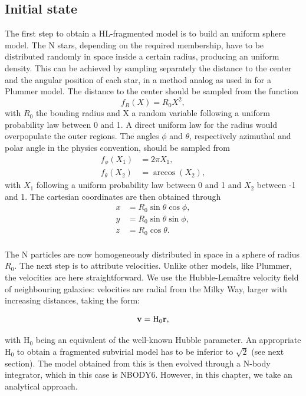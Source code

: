 \subsection{Initial state}

The first step to obtain a HL-fragmented model is to build an uniform sphere model. The N stars, depending on the required membership, have to be distributed randomly in space inside a certain radius, producing an uniform density. This can be achieved by sampling separately the distance to the center and the angular position of each star, in a method analog as used in \cite{Aarseth1974} for a Plummer model. The distance to the center should be sampled from the function
\begin{equation}
f_R(X) = R_0 X^2,
\end{equation} 
with $R_0$ the bouding radius and X a random variable following a uniform probability law between 0 and 1. A direct uniform law for the radius would overpopulate the outer regions. The angles $\phi$ and $\theta$, respectively azimuthal and polar angle in the physics convention, should be sampled from
\begin{align}
f_\phi(X_1) & = 2\pi X_1,\\
f_\theta(X_2) &= \arccos{ (X_2) },
\end{align}
with $X_1$ following a uniform probability law between 0 and 1 and $X_2$ between -1 and 1. The cartesian coordinates are then obtained through
\begin{align}
x &= R_0 \sin{\theta} \cos{\phi},\\
y &= R_0 \sin{\theta} \sin{\phi},\\
z &= R_0 \cos{\theta}. \\
\end{align}

The N particles are now homogeneously distributed in space in a sphere of radius $R_0$. The next step is to attribute velocities. Unlike other models, like Plummer, the velocities are here straightforward. We use the Hubble-Lema\^itre velocity field of neighbouring galaxies: velocities are radial from the Milky Way, larger with increasing distances, taking the form:

\begin{equation}
\label{Eq:1_Hubble}
\bold{v} =  \textrm{H}_0 \bold{r},
\end{equation}

with H$_0$ being an equivalent of the well-known Hubble parameter. An appropriate H$_0$ to obtain a fragmented subvirial model has to be inferior to $\sqrt{2}$ (see next section). The model obtained from this is then evolved through a N-body integrator, which in this case is NBODY6. However, in this chapter, we take an analytical approach.


